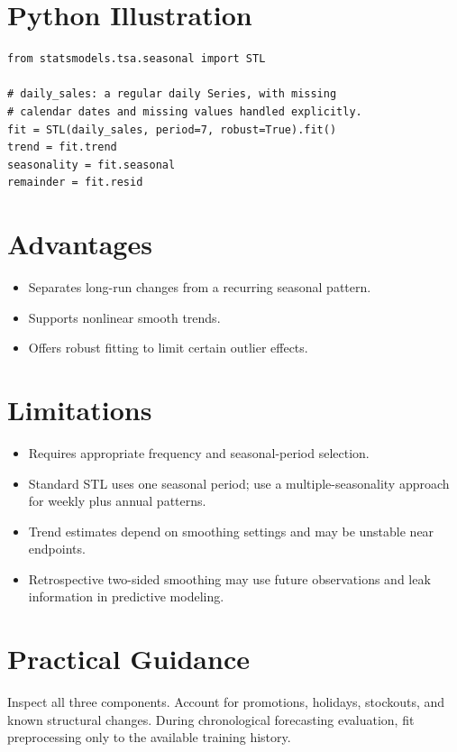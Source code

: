 \documentclass[a4paper]{article}
\begin{document}
\section{Python Illustration}
\begin{verbatim}
from statsmodels.tsa.seasonal import STL

# daily_sales: a regular daily Series, with missing
# calendar dates and missing values handled explicitly.
fit = STL(daily_sales, period=7, robust=True).fit()
trend = fit.trend
seasonality = fit.seasonal
remainder = fit.resid
\end{verbatim}

\section{Advantages}
\begin{itemize}
 \item Separates long-run changes from a recurring seasonal pattern.
 \item Supports nonlinear smooth trends.
 \item Offers robust fitting to limit certain outlier effects.
\end{itemize}

\section{Limitations}
\begin{itemize}
 \item Requires appropriate frequency and seasonal-period selection.
 \item Standard STL uses one seasonal period; use a multiple-seasonality approach for weekly plus annual patterns.
 \item Trend estimates depend on smoothing settings and may be unstable near endpoints.
 \item Retrospective two-sided smoothing may use future observations and leak information in predictive modeling.
\end{itemize}

\section{Practical Guidance}
Inspect all three components. Account for promotions, holidays, stockouts, and known structural changes. During chronological forecasting evaluation, fit preprocessing only to the available training history.



\end{document}
